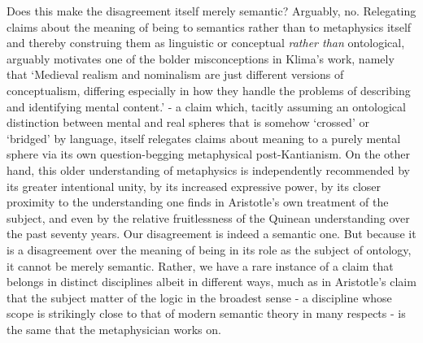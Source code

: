 \documentclass[]{article}
\begin{document}
Does this make the disagreement itself merely semantic? 
Arguably, no. 
Relegating claims about the meaning of being to semantics 
rather than to metaphysics itself 
and thereby construing them as linguistic or conceptual \emph{rather than} ontological, 
arguably motivates one of the bolder misconceptions in Klima's work, 
namely that 
`Medieval realism and nominalism are just different versions of conceptualism, differing especially in how they handle the problems of
describing and identifying mental content.'\autocite[110]{Klima2011} 
- a claim which, 
tacitly assuming an ontological distinction between mental and real spheres that is somehow `crossed' or `bridged' by language, 
itself relegates claims about meaning to a purely mental sphere via its own question-begging metaphysical post-Kantianism.
On the other hand, 
this older understanding of metaphysics is independently recommended 
by its greater intentional unity, 
by its increased expressive power, 
by its closer proximity to the understanding one finds in Aristotle's own treatment of the subject, 
and even by the relative fruitlessness of the Quinean understanding over the past seventy years.
Our disagreement is indeed a semantic one. 
But because it is a disagreement over the meaning of being in its role as the subject of ontology, it cannot be merely semantic. 
Rather, we have a rare instance of a claim that belongs in distinct disciplines albeit in different ways, 
much as in Aristotle's claim that the subject matter of the logic in the broadest sense - 
a discipline whose scope is strikingly close to that of modern semantic theory in many respects - 
is the same that the metaphysician works on. 


\end{document}
